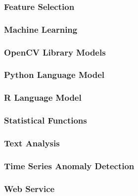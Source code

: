 \subsubsection{Feature Selection}
\subsubsection{Machine Learning}
\subsubsection{OpenCV Library Models}
\subsubsection{Python Language Model}
\subsubsection{R Language Model}
\subsubsection{Statistical Functions}
\subsubsection{Text Analysis}
\subsubsection{Time Series Anomaly Detection}
\subsubsection{Web Service}
